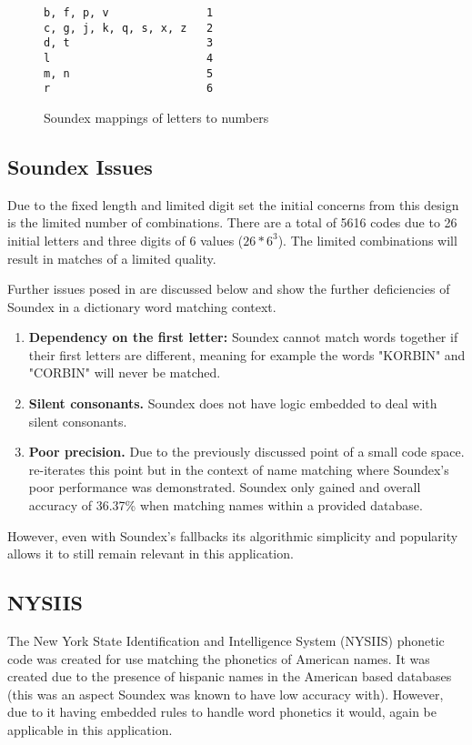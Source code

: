 \begin{figure}[h!]
    \centering
    \begin{BVerbatim}
b, f, p, v               1
c, g, j, k, q, s, x, z   2
d, t                     3
l                        4
m, n                     5
r                        6
    \end{BVerbatim}

    \caption{Soundex mappings of letters to numbers}
    \label{fig:soundexMap}
\end{figure}

\subsection*{Soundex Issues}
\label{sec:soundexIssues}

Due to the fixed length and limited digit set the initial concerns from this design is the limited number of combinations. There are a total of 5616 codes due to 26 initial letters and three digits of 6 values ($26 * 6^3$).
The limited combinations will result in matches of a limited quality.

Further issues posed in \cite{patman2001soundex} are discussed below and show the further deficiencies of Soundex in a dictionary word matching context. 

\begin{enumerate}
    \item \textbf{Dependency on the first letter:} Soundex cannot match words together if their first letters are different, meaning for example the words "KORBIN" and "CORBIN" will never be matched.

    \item \textbf{Silent consonants.} Soundex does not have logic embedded to deal with silent consonants.

    \item \textbf{Poor precision.} Due to the previously discussed point of a small code space. \cite{patman2001soundex} re-iterates this point but in the context of name matching where Soundex's poor performance was demonstrated. Soundex only gained and overall accuracy of 36.37\% when matching names within a provided database.
\end{enumerate}

However, even with Soundex's fallbacks its algorithmic simplicity and popularity allows it to still remain relevant in this application.

\subsection{NYSIIS}
The New York State Identification and Intelligence System (NYSIIS) phonetic code was created for use matching the phonetics of American names. It was created due to the presence of hispanic names in the American based databases (this was an aspect Soundex was known to have low accuracy with). However, due to it having embedded rules to handle word phonetics it would, again be applicable in this application.

